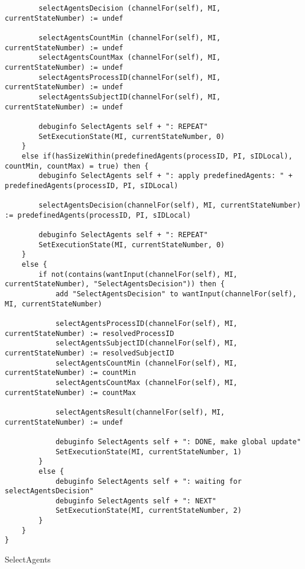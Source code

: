 \begin{listing}[H]
\begin{verbatim}
        selectAgentsDecision (channelFor(self), MI, currentStateNumber) := undef

        selectAgentsCountMin (channelFor(self), MI, currentStateNumber) := undef
        selectAgentsCountMax (channelFor(self), MI, currentStateNumber) := undef
        selectAgentsProcessID(channelFor(self), MI, currentStateNumber) := undef
        selectAgentsSubjectID(channelFor(self), MI, currentStateNumber) := undef

        debuginfo SelectAgents self + ": REPEAT"
        SetExecutionState(MI, currentStateNumber, 0)
    }
    else if(hasSizeWithin(predefinedAgents(processID, PI, sIDLocal), countMin, countMax) = true) then {
        debuginfo SelectAgents self + ": apply predefinedAgents: " + predefinedAgents(processID, PI, sIDLocal)

        selectAgentsDecision(channelFor(self), MI, currentStateNumber) := predefinedAgents(processID, PI, sIDLocal)

        debuginfo SelectAgents self + ": REPEAT"
        SetExecutionState(MI, currentStateNumber, 0)
    }
    else {
        if not(contains(wantInput(channelFor(self), MI, currentStateNumber), "SelectAgentsDecision")) then {
            add "SelectAgentsDecision" to wantInput(channelFor(self), MI, currentStateNumber)

            selectAgentsProcessID(channelFor(self), MI, currentStateNumber) := resolvedProcessID
            selectAgentsSubjectID(channelFor(self), MI, currentStateNumber) := resolvedSubjectID
            selectAgentsCountMin (channelFor(self), MI, currentStateNumber) := countMin
            selectAgentsCountMax (channelFor(self), MI, currentStateNumber) := countMax

            selectAgentsResult(channelFor(self), MI, currentStateNumber) := undef

            debuginfo SelectAgents self + ": DONE, make global update"
            SetExecutionState(MI, currentStateNumber, 1)
        }
        else {
            debuginfo SelectAgents self + ": waiting for selectAgentsDecision"
            debuginfo SelectAgents self + ": NEXT"
            SetExecutionState(MI, currentStateNumber, 2)
        }
    }
}
\end{verbatim}
\caption{SelectAgents}
\label{lst:asm:SelectAgents}
\end{listing}
